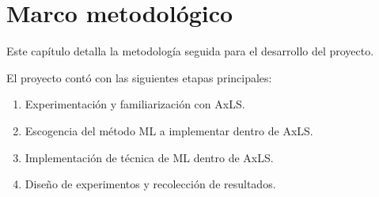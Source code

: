 \chapter{Marco metodológico}

Este capítulo detalla la metodología seguida para el desarrollo del
proyecto.

El proyecto contó con las siguientes etapas principales:

\begin{enumerate}
    \item Experimentación y familiarización con AxLS.
    \item Escogencia del método ML a implementar dentro de AxLS.
    \item Implementación de técnica de ML dentro de AxLS.
    \item Diseño de experimentos y recolección de resultados.
\end{enumerate}


